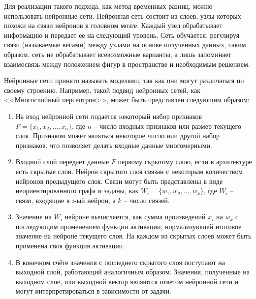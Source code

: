Для реализации такого подхода, как метод временных разниц, можно использовать нейронные сети. Нейронная сеть состоит из слоев, узлы которых похожи на связи нейронов в головном мозге. Каждый узел обрабатывает информацию и передает ее на следующий уровень. Сеть обучается, регулируя связи (называемые весами) между узлами на основе полученных данных, таким образом, сеть не обрабатывает всевозможные варианты, а лишь запоминает взаимосвязь между положением фигур в пространстве и необходимым решением.

Нейронные сети принято называть моделями, так как они могут различаться по своему строению. Например, такой подвид нейронных сетей, как <<Многослойный персептрон>>, может быть представлен следующим образом:
\begin{enumerate}
    \item На вход нейронной сети подается некоторый набор признаков $F = \{x_1, x_2, ..., x_n\}$, где $n$ -- число входных признаков или размер текущего слоя. Признаком может являться некоторое число или другой набор признаков, что позволяет делать входные данные многомерными.
    \item Входной слой передает данные $F$ первому скрытому слою, если в архитектуре есть скрытые слои. Нейрон скрытого слоя связан с некоторым количеством нейронов предыдущего слоя. Связи могут быть представлены в виде неориентированного графа и заданы, как $W_i = \{w_1, w_2, ..., w_k\}$, где $W_i$ -- связи, входящие в $i$-ый нейрон, а $k$ -- число связей.
    \item Значение на $W_i$ нейроне вычисляется, как сумма произведений $x_i$ на $w_k$ с последующим применением функции активации, нормализующей итоговое значение на нейроне текущего слоя. На каждом из скрытых слоев может быть применена своя функция активации.
    \item В конечном счёте значения с последнего скрытого слоя поступают на выходной слой, работающий аналогичным образом. Значения, полученные на выходном слое, или выходной вектор являются ответом нейронной сети и могут интерпретироваться в зависимости от задачи.
\end{enumerate}
